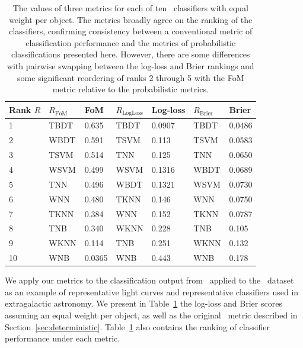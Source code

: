 \begin{table}[]
	\begin{centering}
\begin{tabular}{lllllll}%
Rank $R$ & $R_\mathrm{FoM}$ & FoM & %
$R_\mathrm{LogLoss}$ & Log-loss & $R_\mathrm{Brier}$ & Brier \\
\hline
1  & TBDT & 0.635  %
& TBDT & 0.0907 & TBDT & 0.0486 \\
2  & WBDT & 0.591  %
& TSVM & 0.113  & TSVM & 0.0583 \\
3  & TSVM & 0.514  %
& TNN  & 0.125  & TNN  & 0.0650 \\
4  & WSVM & 0.499  %
& WSVM & 0.1316 & WBDT & 0.0689 \\
5  & TNN  & 0.496  %
& WBDT & 0.1321 & WSVM & 0.0730 \\
6  & WNN  & 0.480  %
& TKNN & 0.146  & WNN  & 0.0750 \\
7  & TKNN & 0.384  %
& WNN  & 0.152  & TKNN & 0.0787 \\
8  & TNB  & 0.340  %
& WKNN & 0.228  & TNB  & 0.105  \\
9  & WKNN & 0.114  %
& TNB  & 0.251  & WKNN & 0.132  \\
10 & WNB  & 0.0365 %
& WNB  & 0.443  & WNB  & 0.178  \\
\end{tabular}
	\caption{
	The values of three metrics for each of ten \snmachine\ classifiers with equal weight per object.
	The metrics broadly agree on the ranking of the classifiers, confirming consistency between a conventional metric of classification performance and the metrics of probabilistic classifications presented here.
	However, there are some differences with pairwise swapping between the log-loss and Brier rankings and some significant reordering of ranks 2 through 5 with the FoM metric relative to the probabilistic metrics.
	}
	\label{tab:snmachineresults}
	\end{centering}
\end{table}

We apply our metrics to the classification output from \snmachine\ applied to the \snphotcc\ dataset as an example of representative light curves and representative classifiers used in extragalactic astronomy.
We present in Table~\ref{tab:snmachineresults} the log-loss and Brier scores assuming an equal weight per object, as well as the original \snphotcc\ metric described in Section~\ref{sec:deterministic}.
Table~\ref{tab:snmachineresults} also contains the ranking of classifier performance under each metric.

